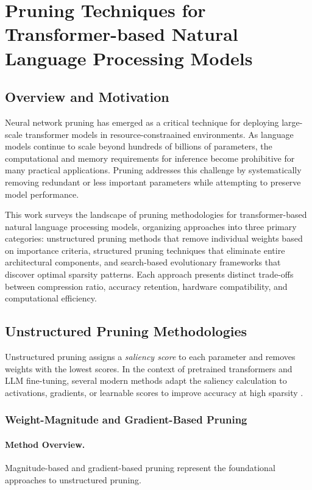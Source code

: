 
\section{Pruning Techniques for Transformer-based Natural Language Processing Models}

\subsection{Overview and Motivation}

Neural network pruning has emerged as a critical technique for deploying large-scale transformer models in resource-constraained environments. As language models continue to scale beyond hundreds of billions of parameters, the computational and memory requirements for inference become prohibitive for many practical applications. Pruning addresses this challenge by systematically removing redundant or less important parameters while attempting to preserve model performance.

This work surveys the landscape of pruning methodologies for transformer-based natural language processing models, organizing approaches into three primary categories: unstructured pruning methods that remove individual weights based on importance criteria, structured pruning techniques that eliminate entire architectural components, and search-based evolutionary frameworks that discover optimal sparsity patterns. Each approach presents distinct trade-offs between compression ratio, accuracy retention, hardware compatibility, and computational efficiency.

\subsection{Unstructured Pruning Methodologies}

Unstructured pruning assigns a \emph{saliency score} to each parameter and removes weights with the lowest scores. In the context of pretrained transformers and LLM fine-tuning, several modern methods adapt the saliency calculation to activations, gradients, or learnable scores to improve accuracy at high sparsity \cite{sanh2020movement,sun2023simple,frantar2023sparsegpt}.

\subsubsection{Weight-Magnitude and Gradient-Based Pruning}

\paragraph{Method Overview.} Magnitude-based and gradient-based pruning represent the foundational approaches to unstructured pruning.

